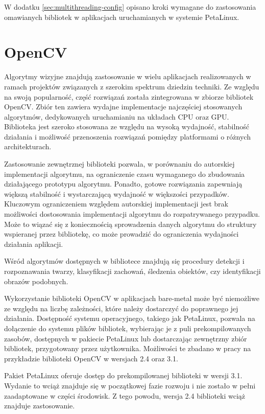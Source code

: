 W dodatku \ref{sec:multithreading-config} opisano kroki wymagane do zastosowania omawianych bibliotek w aplikacjach uruchamianych w systemie PetaLinux.
\section{OpenCV}
\label{sec:opencv-lib}

Algorytmy wizyjne znajdują zastosowanie w wielu aplikacjach realizowanych w ramach projektów związanych z szerokim spektrum dziedzin techniki. Ze względu na swoją popularność, część rozwiązań została zintegrowana w zbiorze bibliotek OpenCV. \cite{opencv-library} Zbiór ten zawiera wydajne implementacje najczęściej stosowanych algorytmów, dedykowanych uruchamianiu na układach CPU oraz GPU. Biblioteka jest szeroko stosowana ze względu na wysoką wydajność, stabilność działania i możliwość przenoszenia rozwiązań pomiędzy platformami o różnych architekturach.

Zastosowanie zewnętrznej biblioteki pozwala, w porównaniu do autorskiej implementacji algorytmu, na ograniczenie czasu wymaganego do zbudowania działającego prototypu algorytmu. Ponadto, gotowe rozwiązania zapewniają większą stabilność i wystarczającą wydajność w większości przypadków. Kluczowym ograniczeniem względem autorskiej implementacji jest brak możliwości dostosowania implementacji algorytmu do rozpatrywanego przypadku. Może to wiązać się z koniecznością sprowadzenia danych algorytmu do struktury wspieranej przez bibliotekę, co może prowadzić do ograniczenia wydajności działania aplikacji.

Wśród algorytmów dostępnych w bibliotece znajdują się procedury detekcji i rozpoznawania twarzy, klasyfikacji zachowań, śledzenia obiektów, czy identyfikacji obrazów podobnych.

Wykorzystanie biblioteki OpenCV w aplikacjach bare-metal może być niemożliwe ze względu na liczbę zależności, które należy dostarczyć do poprawnego jej działania. Dostępność systemu operacyjnego, takiego jak PetaLinux, pozwala na dołączenie do systemu plików bibliotek, wybierając je z puli prekompilowanych zasobów, dostępnych w pakiecie PetaLinux lub dostarczając zewnętrzny zbiór bibliotek, przygotowany przez użytkownika. Możliwości te zbadano w pracy na przykładzie biblioteki OpenCV w wersjach 2.4 oraz 3.1.

Pakiet PetaLinux oferuje dostęp do prekompilowanej biblioteki w wersji 3.1. Wydanie to wciąż znajduje się w początkowej fazie rozwoju i nie zostało w pełni zaadaptowane w części środowisk. Z tego powodu, wersja 2.4 biblioteki wciąż znajduje zastosowanie.

